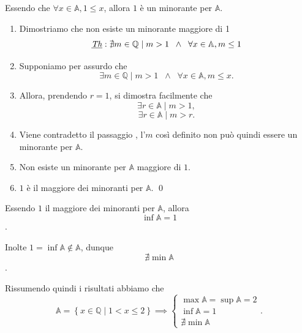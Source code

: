 \begin{example}
\begin{list_3}
        \item Essendo che $\forall x\in\mathbb{A}, 1 \leq x$, allora $1$ è un minorante per $\mathbb{A}$.
        \begin{enumerate}[label=\arabic*.]
            \item Dimostriamo che non esiste un minorante maggiore di 1
            \[ \underbar{\textit{Th}}: \nexists m \in \mathbb{Q} \mid  m > 1 \;\;\land\;\; \forall x \in \mathbb{A}, m \leq 1 \]
            \item \label{pas:esi-min/1} Supponiamo per assurdo che
            \[ \exists m \in \mathbb{Q} \mid m > 1 \;\;\land\;\; \forall x \in \mathbb{A}, m \leq x .\]
            \item Allora, prendendo $r = 1$, si dimostra facilmente che
            \[ \exists r \in \mathbb{A} \mid m > 1,\]
            \[ \exists r \in \mathbb{A} \mid m > r.\]
            \item Viene contradetto il passaggio , l'$m$ così definito non può
            quindi essere un minorante per $\mathbb{A}$.
            \item Non esiste un minorante per $\mathbb{A}$ maggiore di $1$.
            \item $1$ è il maggiore dei minoranti per $\mathbb{A}$.
            \qed
        \end{enumerate}
        \item Essendo $1$ il maggiore dei minoranti per $\mathbb{A}$, allora
        \[ \inf\mathbb{A} = 1 \].
        \item Inolte $1 = \inf\mathbb{A} \notin \mathbb{A}$, dunque
        \[ \nexists\min\mathbb{A}\].

        \item Rissumendo quindi i risultati abbiamo che
        \[
        \mathbb{A} = \left\{ x \in \mathbb{Q} \mid 1 < x \leq 2 \right\} \implies
        \begin{cases}
            \max\mathbb{A} = \sup\mathbb{A} = 2 \\
            \inf\mathbb{A} = 1 \\
            \nexists\min\mathbb{A}
        \end{cases}.
        \]
    \end{list_3}
\end{example}